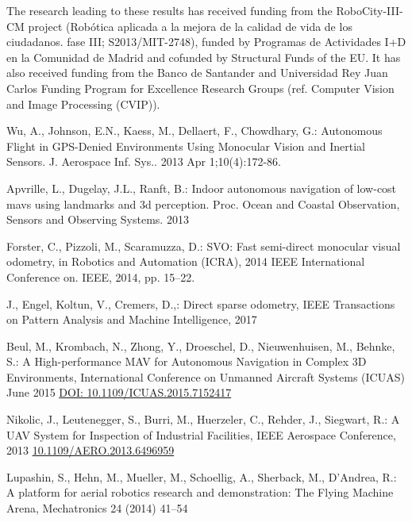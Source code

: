 \documentclass{styles/svproc}
\begin{document}
        The research leading to these results has received funding from the RoboCity\--III\--CM project (Rob\'otica aplicada a la mejora de la calidad de vida de los ciudadanos. fase III; S2013/MIT-2748), funded by Programas de Actividades I+D en la Comunidad de Madrid and cofunded by Structural Funds of the EU. It has also received funding from
the Banco de Santander and Universidad Rey Juan Carlos Funding Program for Excellence Research Groups (ref. Computer Vision and Image Processing (CVIP)).

%
%
\begin{thebibliography}{6}
Wu, A., Johnson, E.N., Kaess, M., Dellaert, F., Chowdhary, G.: Autonomous Flight in GPS-Denied Environments Using Monocular Vision and Inertial Sensors. J. Aerospace Inf. Sys.. 2013 Apr 1;10(4):172-86.

Apvrille, L., Dugelay, J.L., Ranft, B.: Indoor autonomous navigation of low-cost mavs using landmarks and 3d perception. Proc. Ocean and Coastal Observation, Sensors and Observing Systems. 2013 

Forster, C., Pizzoli, M., Scaramuzza, D.: SVO: Fast semi-direct monocular visual odometry, in Robotics and Automation (ICRA), 2014
IEEE International Conference on. IEEE, 2014, pp. 15–22.

J., Engel, Koltun, V., Cremers, D.,: Direct sparse odometry, IEEE Transactions on Pattern Analysis and Machine Intelligence, 2017

Beul, M., Krombach, N., Zhong, Y., Droeschel, D., Nieuwenhuisen, M., Behnke, S.: A High-performance MAV for Autonomous Navigation in Complex 3D Environments, International Conference on Unmanned Aircraft Systems (ICUAS) June 2015 \url{DOI: 10.1109/ICUAS.2015.7152417}

Nikolic, J., Leutenegger, S., Burri, M., Huerzeler, C., Rehder, J., Siegwart, R.: A UAV System for Inspection of Industrial Facilities, IEEE Aerospace Conference, 2013 \url{10.1109/AERO.2013.6496959}

Lupashin, S., Hehn, M., Mueller, M., Schoellig, A., Sherback, M., D’Andrea, R.: A platform for aerial robotics research and demonstration: The Flying Machine Arena, Mechatronics 24 (2014) 41–54


\end{thebibliography}
\end{document}
